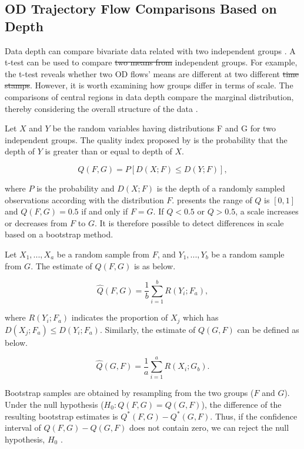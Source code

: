 \documentclass[a4paper,UKenglish]{lipics-v2016}
\providecommand{\DIFadd}[1]{{\protect\color{blue}\uwave{#1}}} %
\providecommand{\DIFdel}[1]{{\protect\color{red}\sout{#1}}}                      %
\providecommand{\DIFaddbegin}{} %
\providecommand{\DIFaddend}{} %
\providecommand{\DIFdelbegin}{} %
\providecommand{\DIFdelend}{} %
\begin{document}
\subsection{OD  {Trajectory }  {Flow } Comparisons Based on Depth}
Data depth can compare bivariate data related with two independent groups \cite{liu93JASA}. 
A t-test can be used to compare \DIFdelbegin \DIFdel{two means from }\DIFdelend \DIFaddbegin \DIFadd{means from two }\DIFaddend independent groups.
For example, the t-test reveals whether two OD flows' means are different at two different \DIFdelbegin \DIFdel{time stamps}\DIFdelend \DIFaddbegin \DIFadd{temporal ranges}\DIFaddend .
However, it is worth examining how groups differ in terms of scale.
The comparisons of central regions in data depth compare the marginal distribution, thereby considering the overall structure of the data \cite{wilcox03MBR}.

Let $X$ and $Y$ be the random variables having distributions F and G for two independent groups. The quality index proposed by \cite{liu93JASA} is the probability that the depth of $Y$ is greater than or equal to depth of $X$. 

\begin{equation*}
Q(F,G) = P[D(X;F) \leq D(Y;F)],
\end{equation*}

where $P$ is the probability and $D(X;F)$ is the depth of a randomly sampled observations according with the distribution $F$. \cite{liu93JASA} presents the range of $Q$ is $[0,1]$ and $Q(F,G) = 0.5$ if and only if $F = G$. If $Q < 0.5$  or $Q > 0.5$, a scale increases or decreases from  $F$ to $G$.   It is therefore possible to detect differences in scale based on a bootstrap method.

Let $X_1,...,X_a$ be a random sample from $F$, and $Y_1,...,Y_b$ be a random sample from $G$. The estimate of $Q(F,G)$ is as below.

\begin{equation*}
\hat{Q}(F,G) =\frac{1}{b} \sum_{i=1}^{b} R(Y_i;F_a),
\end{equation*}

where $R(Y_i;F_a)$ indicates the proportion of $X_j$ which has $D(X_j;F_a) \leq D(Y_i;F_a)$. Similarly, the estimate of $Q(G,F)$ can be defined as below.

\begin{equation*}
\hat{Q}(G,F) =\frac{1}{a} \sum_{i=1}^{a} R(X_i;G_b).
\end{equation*}

Bootstrap samples are obtained by resampling from the two groups ($F$ and $G$). Under the null hypothesis ($H_0: Q(F,G) = Q(G,F)$), the difference of the resulting bootstrap estimates is $Q^*(F,G) - Q^*(G,F)$. Thus, if the confidence interval of $Q(F,G) - Q(G,F)$ does not contain zero, we can reject the null hypothesis, $H_0$ \cite{liu93JASA,wilcox03MBR}.
\end{document}
